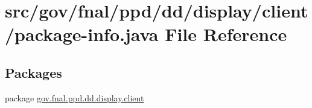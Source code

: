 \hypertarget{dd_2display_2client_2package-info_8java}{\section{src/gov/fnal/ppd/dd/display/client/package-\/info.java File Reference}
\label{dd_2display_2client_2package-info_8java}
}
\subsection*{Packages}
\begin{DoxyCompactItemize}
\item 
package \hyperlink{namespacegov_1_1fnal_1_1ppd_1_1dd_1_1display_1_1client}{gov.\-fnal.\-ppd.\-dd.\-display.\-client}
\end{DoxyCompactItemize}

